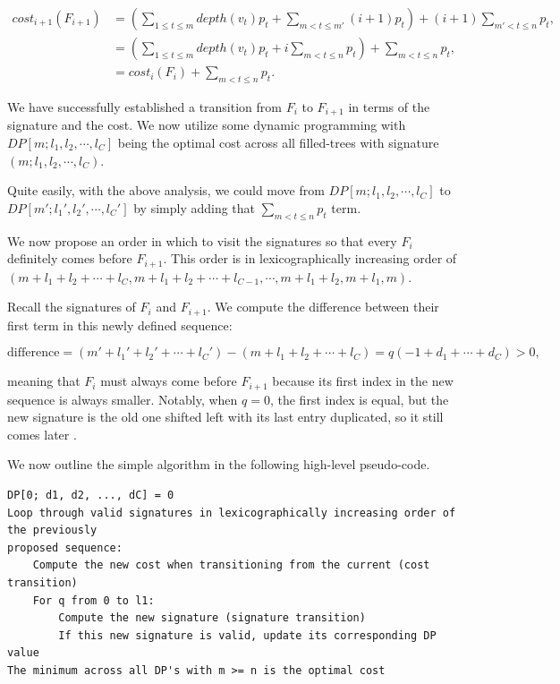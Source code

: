 \documentclass[a4paper,10pt,english]{scrartcl}
\begin{document}
\begin{align}
    cost_{i+1}(F_{i+1}) &= \left(\sum_{1\le t\le m} depth(v_t)p_t + \sum_{m < t \le m'} (i+1)p_t\right) + (i+1)\sum_{m'<t \le n}p_t,\\
    &= \left(\sum_{1\le t\le m} depth(v_t)p_t + i\sum_{m < t \le n} p_t\right) + \sum_{m < t \le n} p_t,\\
    &= cost_i(F_i) + \sum_{m < t \le n} p_t. \label{eq:costtrans}
\end{align}

We have successfully established a transition from $F_i$ to $F_{i+1}$ in terms of the signature and the cost. We now utilize some dynamic programming with $DP[m;l_1, l_2,\cdots ,l_C]$ being the optimal cost across all filled-trees with signature $(m;l_1, l_2,\cdots ,l_C)$.

Quite easily, with the above analysis, we could move from $DP[m;l_1, l_2,\cdots ,l_C]$ to $DP[m';l_1', l_2',\cdots ,l_C']$ by simply adding that $\sum_{m < t \le n} p_t$ term.

We now propose an order in which to visit the signatures so that every $F_i$ definitely comes before $F_{i+1}$. This order is in lexicographically increasing order of $(m+l_1+l_2+\cdots+l_C, m+l_1+l_2+\cdots+l_{C-1}, \cdots , m+l_1+l_2, m+l_1, m)$. 

Recall the signatures of $F_i$ and $F_{i+1}$. We compute the difference between their first term in this newly defined sequence:

$$\text{difference} = (m'+l_1'+l_2'+\cdots+l_C') - (m+l_1+l_2+\cdots+l_C) = q(-1+d_1+\cdots + d_C) > 0,$$

meaning that $F_i$ must always come before $F_{i+1}$ because its first index in the new sequence is always smaller. Notably, when $q = 0$, the first index is equal, but the new signature is the old one shifted left with its last entry duplicated, so it still comes later \cite[Lemma~8]{GolinRote1998}.

We now outline the simple algorithm in the following high-level pseudo-code.

\begin{verbatim}
DP[0; d1, d2, ..., dC] = 0
Loop through valid signatures in lexicographically increasing order of the previously 
proposed sequence:
    Compute the new cost when transitioning from the current (cost transition)
    For q from 0 to l1:
        Compute the new signature (signature transition)
        If this new signature is valid, update its corresponding DP value
The minimum across all DP's with m >= n is the optimal cost 
\end{verbatim}
\end{document}
